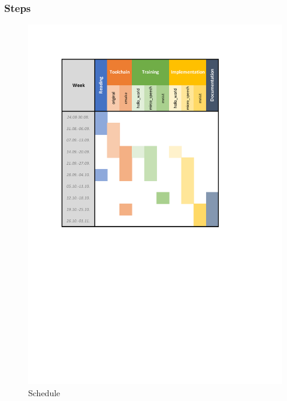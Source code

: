 \documentclass{tum-presentation}
\begin{document}
\begin{frame}
  \frametitle{Steps}
\vspace{-5em}
  \begin{figure}[h]
\centering
\includegraphics[scale=0.8]{figures/fp_report_plan.pdf}
\caption{Schedule}
\label{fig:schedule}
\end{figure}

\end{frame}
\end{document}
